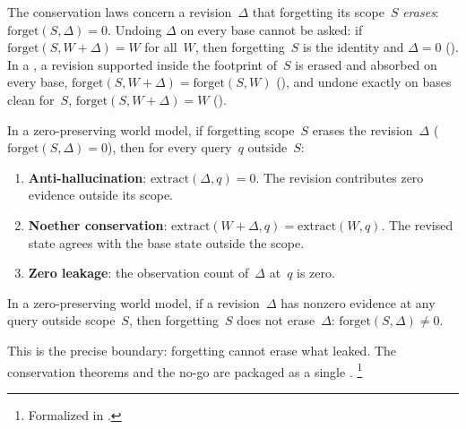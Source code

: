 \documentclass[11pt,openany]{report}
\begin{document}
The conservation laws concern a revision~$\Delta$ that forgetting its
scope~$S$ \emph{erases}: $\mathrm{forget}(S, \Delta) = 0$.  Undoing
$\Delta$ on every base cannot be asked: if
$\mathrm{forget}(S, W + \Delta) = W$ for all~$W$, then forgetting~$S$ is
the identity and $\Delta = 0$ ().
In a , a revision supported inside
the footprint of~$S$ is erased and absorbed on every base,
$\mathrm{forget}(S, W + \Delta) = \mathrm{forget}(S, W)$
(), and undone exactly on bases clean
for~$S$, $\mathrm{forget}(S, W + \Delta) = W$
().

\begin{theorem}
\label{thm:conservation}
In a zero-preserving world model, if forgetting scope~$S$ erases the
revision~$\Delta$ ($\mathrm{forget}(S, \Delta) = 0$), then for every
query~$q$ outside~$S$:
\begin{enumerate}
\item \textbf{Anti-hallucination}: $\mathrm{extract}(\Delta, q) = 0$.
  The revision contributes zero evidence outside its scope.
\item \textbf{Noether conservation}:
  $\mathrm{extract}(W + \Delta, q) = \mathrm{extract}(W, q)$.
  The revised state agrees with the base state outside the scope.
\item \textbf{Zero leakage}: the observation count of~$\Delta$ at~$q$
  is zero.
\end{enumerate}
\end{theorem}

\begin{theorem}
In a zero-preserving world model, if a revision~$\Delta$ has nonzero
evidence at any query outside scope~$S$, then forgetting~$S$ does not
erase~$\Delta$: $\mathrm{forget}(S, \Delta) \neq 0$.
\end{theorem}

\noindent
This is the precise boundary: forgetting cannot erase what leaked.
The conservation theorems and the no-go are packaged as a single
.%
\footnote{Formalized in
.}
\end{document}
